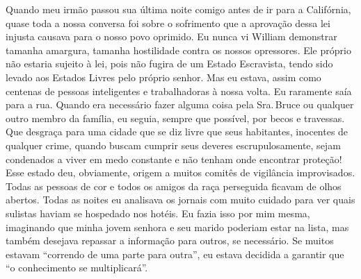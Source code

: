 Quando meu irmão passou sua última
noite comigo antes de ir para a Califórnia, quase toda a nossa conversa
foi sobre o sofrimento que a aprovação dessa lei injusta causava para o
nosso povo oprimido. Eu nunca vi William demonstrar tamanha amargura,
tamanha hostilidade contra os nossos opressores. Ele próprio não estaria
sujeito à lei, pois não fugira de um Estado Escravista, tendo sido
levado aos Estados Livres pelo próprio senhor. Mas eu estava, assim como
centenas de pessoas inteligentes e trabalhadoras à nossa volta. Eu
raramente saía para a rua. Quando era necessário fazer alguma coisa pela
Sra.\,Bruce ou qualquer outro membro da família, eu seguia, sempre que
possível, por becos e travessas. Que desgraça para uma cidade que se diz
livre que seus habitantes, inocentes de qualquer crime, quando buscam
cumprir seus deveres escrupulosamente, sejam condenados a viver em medo
constante e não tenham onde encontrar proteção! Esse estado deu,
obviamente, origem a muitos comitês de vigilância improvisados. Todas as
pessoas de cor e todos os amigos da raça perseguida ficavam de olhos
abertos. Todas as noites eu analisava os jornais com muito cuidado para
ver quais sulistas haviam se hospedado nos hotéis. Eu fazia isso por mim
mesma, imaginando que minha jovem senhora e seu marido poderiam estar na
lista, mas também desejava repassar a informação para outros, se
necessário. Se muitos estavam ``correndo de uma parte para outra'', eu
estava decidida a garantir que ``o conhecimento se multiplicará''.

